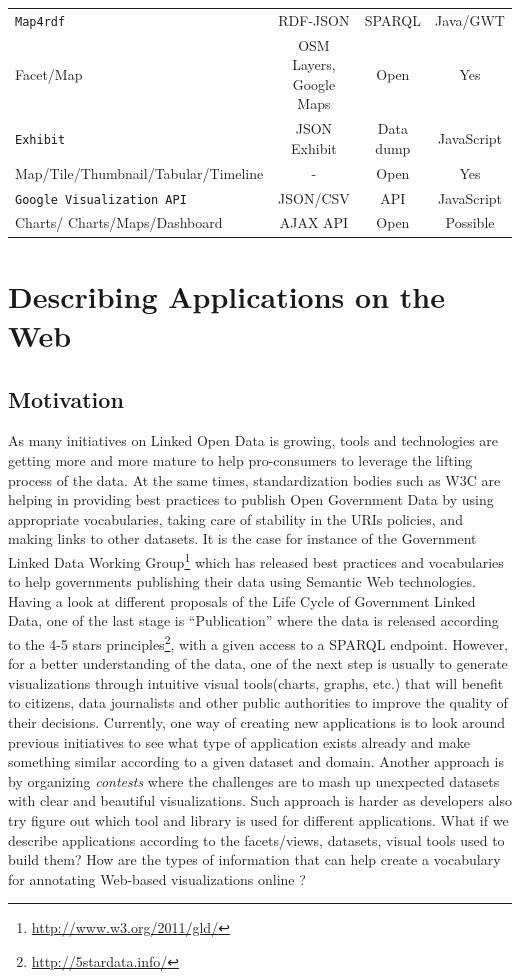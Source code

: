 \begin{landscape}
\begin{table}[htb!]
\begin{tabular}{lccc}
    \midrule
    \texttt{Map4rdf} & RDF-JSON & SPARQL & Java/GWT \\
    Facet/Map & OSM Layers, Google Maps & Open & Yes \\
    \midrule
    \texttt{Exhibit} & JSON Exhibit & Data dump & JavaScript \\
    Map/Tile/Thumbnail/Tabular/Timeline & \-- & Open & Yes \\
    \midrule
    \texttt{Google Visualization API} & JSON/CSV & API & JavaScript \\
    Charts/ Charts/Maps/Dashboard & AJAX API & Open & Possible \\
    \bottomrule
  \end{tabular}
\end{table}
\end{landscape}

\section{Describing Applications on the Web}
 \label{sec:descApps}

 \subsection{Motivation}
As many initiatives on Linked Open Data is growing, tools and technologies are getting more and more mature to help pro-consumers to leverage the lifting process of the data. At the same times, standardization bodies such as W3C are helping in providing best practices to publish Open Government Data by using appropriate vocabularies, taking care of stability in the URIs policies, and making links to other datasets. It is the case for instance of the Government Linked Data Working Group\footnote{\url{http://www.w3.org/2011/gld/}} which has released best practices and vocabularies to help governments publishing their data using Semantic Web technologies. Having a look at different proposals of the Life Cycle of Government Linked Data, one of the last stage is ``Publication'' where the data is released according to the 4-5 stars principles\footnote{\url{http://5stardata.info/}}, with a given access to a SPARQL endpoint. However, for a better understanding of the data, one of the next step is usually to generate visualizations through intuitive visual tools(charts, graphs, etc.) that will benefit to citizens, data journalists and other public authorities to improve the quality of their decisions. Currently, one way of creating new applications is to look around previous initiatives to see what type of application exists already and make something similar according to a given dataset and domain. Another approach is by organizing \textit{contests} where the challenges are to mash up unexpected datasets with clear and beautiful visualizations. Such approach is harder as developers also try figure out which tool and library is used for different applications. What if we describe applications according to the facets/views, datasets, visual tools used to build them? How are the types of information that can help create a vocabulary for annotating Web-based visualizations online ?

